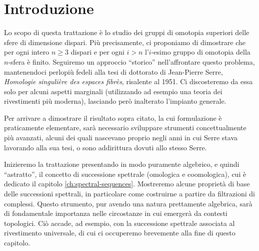 \chapter*{Introduzione}
Lo scopo di questa trattazione è lo studio dei gruppi di omotopia superiori delle sfere di dimensione dispari. Più precisamente, ci proponiamo di dimostrare che per ogni intero \(n\ge 3\) dispari e per ogni \(i>n\) l'\(i\)-esimo gruppo di omotopia della \(n\)-sfera è finito. Seguiremo un approccio \enquote{storico} nell'affrontare questo problema, mantenendoci perlopiù fedeli alla tesi di dottorato di Jean-Pierre Serre, \emph{Homologie singulière des espaces fibrès}, risalente al 1951. Ci discosteremo da essa solo per alcuni aspetti marginali (utilizzando ad esempio una teoria dei rivestimenti più moderna), lasciando però inalterato l'impianto generale.

Per arrivare a dimostrare il risultato sopra citato, la cui formulazione è praticamente elementare, sarà necessario sviluppare strumenti concettualmente più avanzati, alcuni dei quali nascevano proprio negli anni in cui Serre stava lavorando alla sua tesi, o sono addirittura dovuti allo stesso Serre.

Inizieremo la trattazione presentando in modo puramente algebrico, e quindi \enquote{astratto}, il concetto di successione spettrale (omologica e coomologica), cui è dedicato il capitolo \ref{ch:spectral-sequences}. Mostreremo alcune proprietà di base delle successioni spettrali, in particolare come costruirne a partire da filtrazioni di complessi. Questo strumento, pur avendo una natura prettamente algebrica, sarà di fondamentale importanza nelle circostanze in cui emergerà da contesti topologici. Ciò accade, ad esempio, con la successione spettrale associata al rivestimento universale, di cui ci occuperemo brevemente alla fine di questo capitolo.

